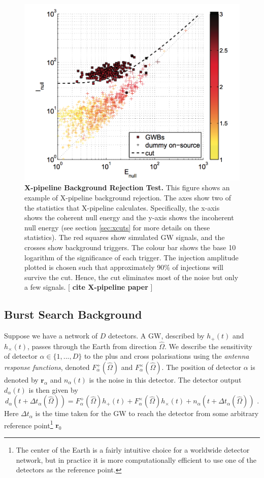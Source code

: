 \documentclass[11pt]{cuthesis}
\newcommand{\fs}{\text{ .}}
\newcommand{\Fp}{F^{+}_{\alpha}}
\newcommand{\Fx}{F^{\times}_{\alpha}}
\newcommand{\xp}{X-pipeline }
\begin{document}
\begin{figure} %
\begin{center}
\includegraphics[width=0.8\linewidth]{xpipeline_cut.png}
\end{center}
\caption{ \textbf{\xp Background Rejection Test.} This figure shows an example of \xp background rejection. The axes show two of the statistics that \xp calculates. Specifically, the x-axis shows the coherent null energy and the y-axis shows the incoherent null energy (see section \ref{sec:xcuts} for more details on these statistics). The red squares show simulated GW signals, and the crosses show background triggers. The colour bar shows the base 10 logarithm of the significance of each trigger. The injection amplitude plotted is chosen such that approximately 90\% of injections will survive the cut. Hence, the cut eliminates most of the noise but only a few signals. [\textbf{ cite \xp paper }]  }
\label{fig:xcuts}
\end{figure}

\subsection{Burst Search Background}
Suppose we have a network of $D$ detectors. A GW, described by $h_+(t)$ and $h_\times (t)$, passes through the Earth from direction $\hat{\Omega}$. We describe the sensitivity of detector $\alpha \in \{1,...,D \}$ to the plus and cross polarisations using the \emph{antenna response functions}, denoted $\Fp (\hat{\Omega})$ and $\Fx(\hat{\Omega})$. The position of detector $\alpha$ is denoted by $\textbf{r}_\alpha$ and $n_\alpha (t)$ is the noise in this detector. The detector output $d_\alpha (t)$ is then given by
\begin{equation} \label{det_output}
d_\alpha (t + \Delta t_\alpha (\hat{\Omega})) = \Fp (\hat{\Omega}) h_+ (t) + \Fx (\hat{\Omega}) h_\times (t) + n_\alpha (t + \Delta t_\alpha (\hat{\Omega})) \fs
\end{equation}   
Here $\Delta t_\alpha$ is the time taken for the GW to reach the detector from some arbitrary reference point\footnote{The center of the Earth is a fairly intuitive choice for a worldwide detector network, but in practice it is more computationally efficient to use one of the detectors as the reference point.} $\textbf{r}_0$
\end{document}
